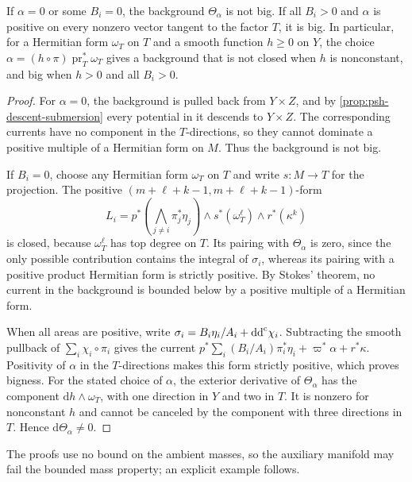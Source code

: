 \begin{corollary}\label{cor:general-auxiliary-background-boundaries}
If $\alpha=0$ or some $B_i=0$, the background $\Theta_\alpha$ is not big. If all $B_i>0$ and $\alpha$ is positive on every nonzero vector tangent to the factor $T$, it is big. In particular, for a Hermitian form $\omega_T$ on $T$ and a smooth function $h\geq0$ on $Y$, the choice $\alpha=(h\circ\pi)\operatorname{pr}_T^*\omega_T$ gives a background that is not closed when $h$ is nonconstant, and big when $h>0$ and all $B_i>0$.
\end{corollary}
\begin{proof}
For $\alpha=0$, the background is pulled back from $Y\times Z$, and by \cref{prop:psh-descent-submersion} every potential in it descends to $Y\times Z$. The corresponding currents have no component in the $T$-directions, so they cannot dominate a positive multiple of a Hermitian form on $M$. Thus the background is not big.

If $B_i=0$, choose any Hermitian form $\omega_T$ on $T$ and write $s\colon M\to T$ for the projection. The positive $(m+\ell+k-1,m+\ell+k-1)$-form
\[
 L_i=p^*\left(\bigwedge_{j\ne i}\pi_j^*\eta_j\right)
       \wedge s^*(\omega_T^\ell)\wedge r^*(\kappa^k)
\]
is closed, because $\omega_T^\ell$ has top degree on $T$. Its pairing with $\Theta_\alpha$ is zero, since the only possible contribution contains the integral of $\sigma_i$, whereas its pairing with a positive product Hermitian form is strictly positive. By Stokes' theorem, no current in the background is bounded below by a positive multiple of a Hermitian form.

When all areas are positive, write $\sigma_i=B_i\eta_i/A_i+\mathrm{dd}^{\mathrm{c}}\chi_i$. Subtracting the smooth pullback of $\sum_i\chi_i\circ\pi_i$ gives the current $p^*\sum_i(B_i/A_i)\pi_i^*\eta_i+\varpi^*\alpha+r^*\kappa$. Positivity of $\alpha$ in the $T$-directions makes this form strictly positive, which proves bigness. For the stated choice of $\alpha$, the exterior derivative of $\Theta_\alpha$ has the component $\mathrm dh\wedge\omega_T$, with one direction in $Y$ and two in $T$. It is nonzero for nonconstant $h$ and cannot be canceled by the component with three directions in $T$. Hence $\mathrm d\Theta_\alpha\ne0$.
\end{proof}

The proofs use no bound on the ambient masses, so the auxiliary manifold may fail the bounded mass property; an explicit example follows.
